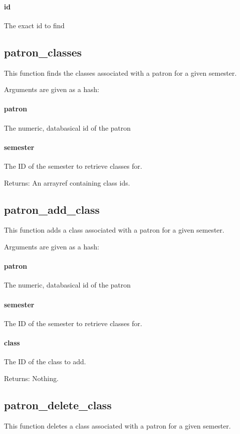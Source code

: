\documentclass[12pt,titlepage]{article}
\begin{document}
\paragraph{id}
The exact id to find

\subsection{patron_classes}
This function finds the classes associated with a patron for a given semester.

Arguments are given as a hash:
\paragraph{patron}
The numeric, databasical id of the patron 

\paragraph{semester}
The ID of the semester to retrieve classes for. 

Returns: An arrayref containing class ids.

\subsection{patron_add_class}
This function adds a class associated with a patron for a given semester.

Arguments are given as a hash:
\paragraph{patron}
The numeric, databasical id of the patron 

\paragraph{semester}
The ID of the semester to retrieve classes for. 

\paragraph{class}
The ID of the class to add. 

Returns: Nothing.

\subsection{patron_delete_class}
This function deletes a class associated with a patron for a given semester.
\end{document}
